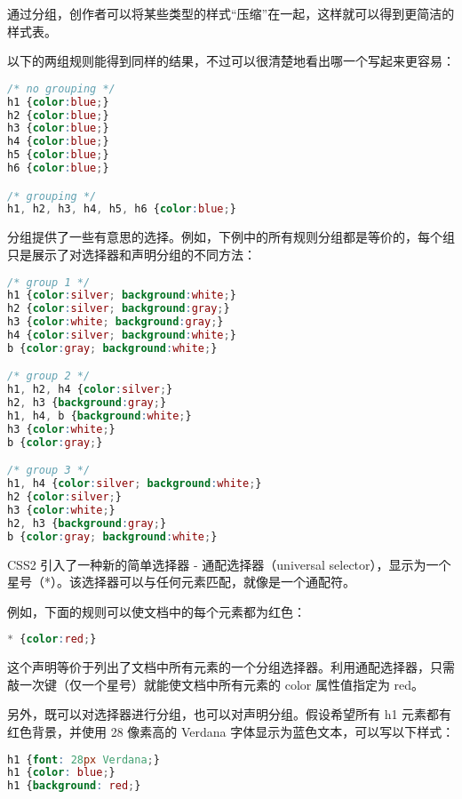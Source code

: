 通过分组，创作者可以将某些类型的样式“压缩”在一起，这样就可以得到更简洁的样式表。


以下的两组规则能得到同样的结果，不过可以很清楚地看出哪一个写起来更容易：


\begin{lstlisting}[language=CSS]
/* no grouping */
h1 {color:blue;}
h2 {color:blue;}
h3 {color:blue;}
h4 {color:blue;}
h5 {color:blue;}
h6 {color:blue;}

/* grouping */
h1, h2, h3, h4, h5, h6 {color:blue;}
\end{lstlisting}




分组提供了一些有意思的选择。例如，下例中的所有规则分组都是等价的，每个组只是展示了对选择器和声明分组的不同方法：


\begin{lstlisting}[language=CSS]
/* group 1 */
h1 {color:silver; background:white;}
h2 {color:silver; background:gray;}
h3 {color:white; background:gray;}
h4 {color:silver; background:white;}
b {color:gray; background:white;}

/* group 2 */
h1, h2, h4 {color:silver;}
h2, h3 {background:gray;}
h1, h4, b {background:white;}
h3 {color:white;}
b {color:gray;}

/* group 3 */
h1, h4 {color:silver; background:white;}
h2 {color:silver;}
h3 {color:white;}
h2, h3 {background:gray;}
b {color:gray; background:white;}
\end{lstlisting}


CSS2 引入了一种新的简单选择器 - 通配选择器（universal selector），显示为一个星号（*）。该选择器可以与任何元素匹配，就像是一个通配符。

例如，下面的规则可以使文档中的每个元素都为红色：

\begin{lstlisting}[language=CSS]
* {color:red;}
\end{lstlisting}




这个声明等价于列出了文档中所有元素的一个分组选择器。利用通配选择器，只需敲一次键（仅一个星号）就能使文档中所有元素的 color 属性值指定为 red。


另外，既可以对选择器进行分组，也可以对声明分组。假设希望所有 h1 元素都有红色背景，并使用 28 像素高的 Verdana 字体显示为蓝色文本，可以写以下样式：

\begin{lstlisting}[language=CSS]
h1 {font: 28px Verdana;}
h1 {color: blue;}
h1 {background: red;}
\end{lstlisting}


